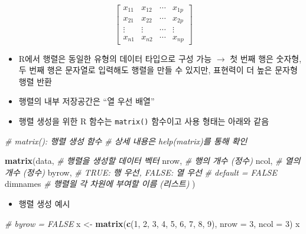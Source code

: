 \documentclass[
  11pt,
]{krantz}
\newenvironment{Shaded}{\begin{snugshade}}{\end{snugshade}}
\newcommand{\CommentTok}[1]{\textcolor[rgb]{0.37,0.37,0.37}{\textit{#1}}}
\newcommand{\DataTypeTok}[1]{\textcolor[rgb]{0.27,0.27,0.27}{#1}}
\newcommand{\DecValTok}[1]{\textcolor[rgb]{0.06,0.06,0.06}{#1}}
\newcommand{\KeywordTok}[1]{\textcolor[rgb]{0.27,0.27,0.27}{\textbf{#1}}}
\newcommand{\NormalTok}[1]{#1}
\newcommand{\StringTok}[1]{\textcolor[rgb]{0.5,0.5,0.5}{#1}}
\providecommand{\tightlist}{%
  \setlength{\itemsep}{0pt}\setlength{\parskip}{0pt}}
\begin{document}
\[\begin{bmatrix}
x_{11} & x_{12} & \cdots & x_{1p} \\
x_{21} & x_{22} & \cdots & x_{2p} \\
\vdots & \vdots & \cdots & \vdots \\
x_{n1} & x_{n2} & \cdots & x_{np}
\end{bmatrix}
\]

\begin{itemize}
\tightlist
\item
  R에서 행렬은 동일한 유형의 데이터 타입으로 구성 가능 \(\rightarrow\) 첫 번째 행은 숫자형, 두 번째 행은 문자열로 입력해도 행렬을 만들 수 있지만, 표현력이 더 높은 문자형 행렬 반환
\item
  행렬의 내부 저장공간은 ``열 우선 배열''
\item
  행렬 생성을 위한 R 함수는 \texttt{matrix()} 함수이고 사용 형태는 아래와 같음
\end{itemize}

\footnotesize

\begin{Shaded}
\begin{Highlighting}[]
\CommentTok{# matrix(): 행렬 생성 함수}
\CommentTok{# 상세 내용은 help(matrix)를 통해 확인}

\KeywordTok{matrix}\NormalTok{(data, }\CommentTok{# 행렬을 생성할 데이터 벡터 }
\NormalTok{       nrow, }\CommentTok{# 행의 개수 (정수)}
\NormalTok{       ncol, }\CommentTok{# 열의 개수 (정수)}
\NormalTok{       byrow, }\CommentTok{# TRUE: 행 우선, FALSE: 열 우선}
              \CommentTok{# default = FALSE}
\NormalTok{       dimnames }\CommentTok{# 행렬읠 각 차원에 부여할 이름 (리스트)}
\NormalTok{       )}
\end{Highlighting}
\end{Shaded}

\normalsize

\begin{itemize}
\tightlist
\item
  행렬 생성 예시
\end{itemize}

\footnotesize

\begin{Shaded}
\begin{Highlighting}[]
\CommentTok{# byrow = FALSE}
\NormalTok{x <-}\StringTok{ }\KeywordTok{matrix}\NormalTok{(}\KeywordTok{c}\NormalTok{(}\DecValTok{1}\NormalTok{, }\DecValTok{2}\NormalTok{, }\DecValTok{3}\NormalTok{, }\DecValTok{4}\NormalTok{, }\DecValTok{5}\NormalTok{, }\DecValTok{6}\NormalTok{, }\DecValTok{7}\NormalTok{, }\DecValTok{8}\NormalTok{, }\DecValTok{9}\NormalTok{), }\DataTypeTok{nrow =} \DecValTok{3}\NormalTok{, }\DataTypeTok{ncol =} \DecValTok{3}\NormalTok{)}
\NormalTok{x}
\end{Highlighting}
\end{Shaded}
\end{document}
